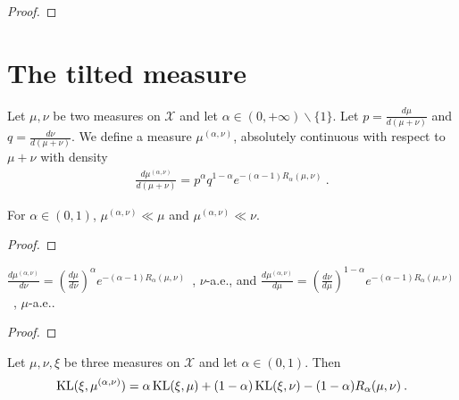 \begin{proof}
\end{proof}

\section{The tilted measure}

\begin{definition}
  \label{def:renyiMeasure}
  \leanok
  Let $\mu, \nu$ be two measures on $\mathcal X$ and let $\alpha \in (0, +\infty) \backslash \{1\}$. Let $p = \frac{d \mu}{d (\mu + \nu)}$ and $q = \frac{d \nu}{d (\mu + \nu)}$. We define a measure $\mu^{(\alpha, \nu)}$, absolutely continuous with respect to $\mu + \nu$ with density
  \begin{align*}
  \frac{d \mu^{(\alpha, \nu)}}{d (\mu + \nu)} = p^\alpha q^{1 - \alpha} e^{-(\alpha - 1)R_\alpha(\mu, \nu)} \: .
  \end{align*}
\end{definition}

\begin{lemma}
  \label{lem:renyiMeasure_ac}
  For $\alpha \in (0,1)$, $\mu^{(\alpha, \nu)} \ll \mu$ and $\mu^{(\alpha, \nu)} \ll \nu$.
\end{lemma}

\begin{proof}%
\uses{}

\end{proof}

\begin{lemma}
  \label{lem:rnDeriv_renyiMeasure}
  $\frac{d \mu^{(\alpha, \nu)}}{d \nu} = \left(\frac{d\mu}{d\nu}\right)^\alpha e^{-(\alpha - 1) R_\alpha(\mu, \nu)}$~, $\nu$-a.e.,
  and
  $\frac{d \mu^{(\alpha, \nu)}}{d \mu} = \left(\frac{d\nu}{d\mu}\right)^{1 - \alpha} e^{-(\alpha - 1) R_\alpha(\mu, \nu)}$~, $\mu$-a.e..
\end{lemma}

\begin{proof}%
{}

\end{proof}

\begin{lemma}
  \label{lem:kl_renyiMeasure_eq}
  Let $\mu, \nu, \xi$ be three measures on $\mathcal X$ and let $\alpha \in (0, 1)$. Then
  \begin{align*}
  \operatorname{KL}(\xi, \mu^{(\alpha, \nu)}) = \alpha \operatorname{KL}(\xi, \mu) + (1 - \alpha)\operatorname{KL}(\xi, \nu) - (1 - \alpha) R_\alpha(\mu, \nu) \: .
  \end{align*}
\end{lemma}

